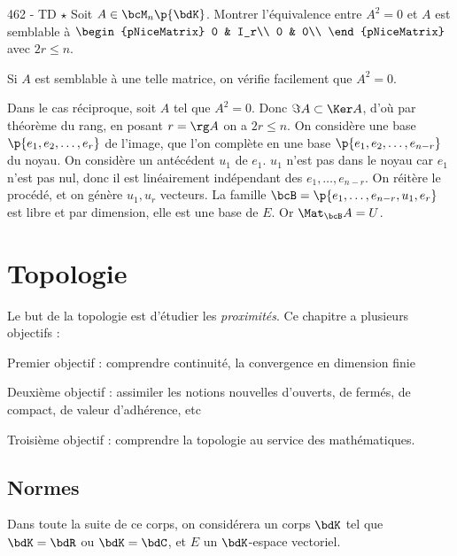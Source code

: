 \documentclass[a4paper,french,bookmarks]{book}
\newcommand{\chaptertoc}[0]{
    \setcounter{tocdepth}{2}
    \begin{tcolorbox}[
        enhanced,
        frame hidden,
        sharp corners,
        detach title,
        spread outwards     = 5pt,
        halign              = center,
        valign              = center,
        borderline west     = {3pt}{0pt}{main20!50!main2!95!gray!90},
        coltitle            = main20!50!main2!95!gray!90, 
        interior style      = {
            left color      = main1white2!65!gray!11,
            middle color    = main1white2!50!gray!10,
            right color     = main1white2!35!gray!9
        },
        arc                 = 0 cm,
        title               = SOMMAIRE,
        boxrule             = 0pt,
        fonttitle           = \bfseries\sffamily,
        overlay             = {
            \node[rotate=90, minimum width=1cm, anchor=south,yshift=-0.8cm]
            at (frame.west) {\tcbtitle};
        }
    ]
        \begin{minipage}{0.83\linewidth}
            \sffamily
            \minitoc
        \end{minipage}
    \end{tcolorbox}
}
\begin{document}
    \begin{exercise}{462 - TD $\star$}{}
        Soit $A \in \bcM_n\p{\bdK}$. Montrer l'équivalence entre $A^2 = 0$ et
        $A$ est semblable à $\begin{pNiceMatrix}
            0 & I_r\\
            0 & 0\\
        \end{pNiceMatrix}$ avec $2r \leq n$.
        \tcbline
        
        Si $A$ est semblable à une telle matrice, on vérifie facilement que $A^2 = 0$. 
        
        Dans le cas réciproque, soit $A$ tel que $A^2 = 0$. Donc $\Im A \subset \Ker A$, d'où par théorème du rang, en posant $r = \rg A$ on a $2r \leq n$. On considère une base $\p{e_1, e_2, \dots, e_r}$ de l'image, que l'on complète en une base $\p{e_1, e_2, \dots, e_{n-r}}$ du noyau. On considère un antécédent $u_1$ de $e_1$. $u_1$ n'est pas dans le noyau car $e_1$ n'est pas nul, donc il est linéairement indépendant des $e_1, \dots, e_{n-r}$. On réitère le procédé, et on génère $u_1, u_r$ vecteurs. La famille $\bcB = \p{e_1, \dots, e_{n-r}, u_1, e_r}$ est libre et par dimension, elle est une base de $E$. Or $\Mat_\bcB A = U$.
    \end{exercise}

    \chapter{Topologie}
    
    Le but de la topologie est d'étudier les \emph{proximités}. Ce chapitre a plusieurs objectifs :
    \begin{enumerate}
        \itt Premier objectif : comprendre continuité, la convergence en dimension finie
        
        \itt Deuxième objectif : assimiler les notions nouvelles d'ouverts, de fermés, de compact, de valeur d'adhérence, etc
        
        \itt Troisième objectif : comprendre la topologie au service des mathématiques.
    \end{enumerate}
    
    \chaptertoc
    
    \section{Normes}
    
    Dans toute la suite de ce corps, on considérera un corps $\bdK$ tel que $\bdK = \bdR$ ou $\bdK = \bdC$, et $E$ un $\bdK$-espace vectoriel.
    
\end{document}
